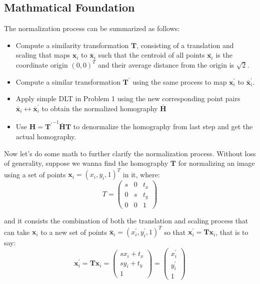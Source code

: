 \documentclass[conference]{IEEEtran}
\newcommand{\mat}[1]{\mathbf{#1}} %
\begin{document}
\subsection{Mathmatical Foundation}
The normalization process can be summarized as follows:
\begin{itemize}
	\item Compute a similarity transformation $\mat{T}$, consisting of a translation and scaling that maps $\mat{x}_i$ to $\bar{\mat{x}}_i$ such that the centroid of all points $\bar{\mat{x}_i}$ is the coordinate origin $(0, 0)^T$ and their average distance from the origin is $\sqrt{2}$.
	\item Compute a similar transformation $\mat{T}^\prime$ using the same process to map $\mat{x}_i^\prime$ to $\bar{\mat{x}}_i^\prime$.
	\item Apply simple DLT in Problem 1 using the new corresponding point pairs $\bar{\mat{x}}_i\leftrightarrow \bar{\mat{x}}_i^\prime$ to obtain the normalized homography $\bar{\mat{H}}$
	\item Use $\mat{H} = {\mat{T}^\prime}^{-1}\bar{\mat{H}}\mat{T}$ to denormalize the homography from last step and get the actual homography.
\end{itemize}

Now let's do some math to further clarify the normalization process. Without loss of generality, suppose we wanna find the homography $\mat{T}$ for normalizing an image using a set of points $\mat{x}_i = (x_i, y_i, 1)^T$  in it, where:
\begin{equation}
	T = 
	\begin{pmatrix}
		s & 0 & t_x\\
		0 & s & t_y\\
		0 & 0 & 1
	\end{pmatrix}
\end{equation}

and it consists the combination of both the translation and scaling process that can take $\mat{x}_i$ to a new set of points $\bar{\mat{x}}_i = ({x}_i^\prime, {y}_i^\prime, 1)^T$ so that ${\mat{x}}_i^\prime = \mat{T}\mat{x}_i$, that is to say:
\begin{equation}
	{\mat{x}}_i^\prime = \mat{T}\mat{x}_i = 
	\begin{pmatrix}
		sx_i + t_x\\
		sy_i + t_y\\
		1
	\end{pmatrix}= 
	\begin{pmatrix}
		{x}_i^\prime\\
		{y}_i^\prime\\
		1
	\end{pmatrix}
\end{equation}
\end{document}

